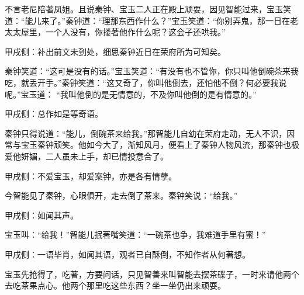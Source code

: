\begin{parag}
    不言老尼陪著凤姐。且说秦钟、宝玉二人正在殿上顽耍，因见智能过来，宝玉笑道：“能儿来了。”秦钟道：“理那东西作什么？”宝玉笑道：“你别弄鬼，那一日在老太太屋里，一个人没有，你搂著他作什么呢？这会子还哄我。”\begin{note}甲戌侧：补出前文未到处，细思秦钟近日在荣府所为可知矣。\end{note}秦钟笑道：“这可是没有的话。”宝玉笑道：“有没有也不管你，你只叫他倒碗茶来我吃，就丢开手。”秦钟笑道：“这又奇了，你叫他倒去，还怕他不倒？何必要我说呢。”宝玉道： “我叫他倒的是无情意的，不及你叫他倒的是有情意的。”\begin{note}甲戌侧：总作如是等奇语。\end{note}秦钟只得说道：“能儿，倒碗茶来给我。”那智能儿自幼在荣府走动，无人不识，因常与宝玉秦钟顽笑。他如今大了，渐知风月，便看上了秦钟人物风流，那秦钟也极爱他妍媚，二人虽未上手，却已情投意合了。\begin{note}甲戌侧：不爱宝玉，却爱案钟，亦是各有情孽。\end{note}今智能见了秦钟，心眼俱开，走去倒了茶来。秦钟笑说：“给我。”\begin{note}甲戌侧：如闻其声。\end{note}宝玉叫：“给我！”智能儿抿著嘴笑道：“一碗茶也争，我难道手里有蜜！”\begin{note}甲戌侧：一语毕肖，如闻其语，观者已自酥倒，不知作者从何著想。\end{note}宝玉先抢得了，吃著，方要问话，只见智善来叫智能去摆茶碟子，一时来请他两个去吃茶果点心。他两个那里吃这些东西？坐一坐仍出来顽耍。
\end{parag}


